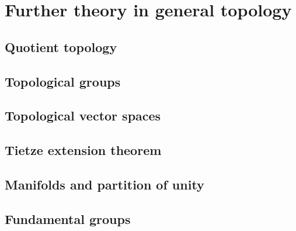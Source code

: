 \part{Further theory in general topology}
\chapter{Quotient topology}
    
    
\chapter{Topological groups}
    
    
    
\chapter{Topological vector spaces}
    
    
\chapter{Tietze extension theorem}
\chapter{Manifolds and partition of unity}
\chapter{Fundamental groups}

